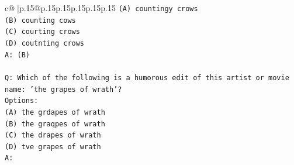 \documentclass{article}
\begin{document}
{\begin{supertabular}{c@{$\;$}|p{.15\linewidth}@{}p{.15\linewidth}p{.15\linewidth}p{.15\linewidth}p{.15\linewidth}p{.15\linewidth}}
{{{\texttt{(A) countingy crows} \\
\texttt{(B) counting cows} \\
\texttt{(C) courting crows} \\
\texttt{(D) coutnting crows} \\
\texttt{A: (B)} \\
\\ 
\texttt{Q: Which of the following is a humorous edit of this artist or movie name: 'the grapes of wrath'?} \\
\texttt{Options:} \\
\texttt{(A) the grdapes of wrath} \\
\texttt{(B) the graqpes of wrath} \\
\texttt{(C) the drapes of wrath} \\
\texttt{(D) tve grapes of wrath} \\
\texttt{A:} \\
            }
        }
    }
     \\ \\


\end{supertabular}}
\end{document}
